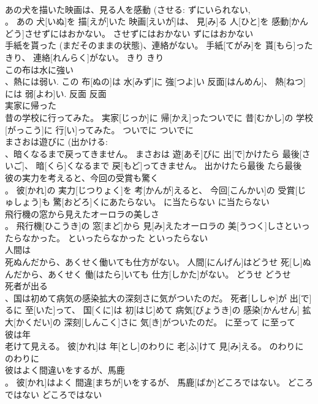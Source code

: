 \documentclass[8pt]{extreport}
\begin{document}
\begin{CJK}{UTF8}{min}
\\	あの犬を描いた映画は、見る人を感動 (させる: ずにいられない, 
\\	。	あの 犬[いぬ]を 描[えが]いた 映画[えいが]は、 見[み]る 人[ひと]を 感動[かんどう]させずにはおかない。	させずにはおかない	ずにはおかない	
\\	手紙を貰った (まだそのままの状態)、連絡がない。	手紙[てがみ]を 貰[もら]ったきり、 連絡[れんらく]がない。	きり	きり	
\\	この布は水に強い 
\\	、熱には弱い.	この 布[ぬの]は 水[みず]に 強[つよ]い 反面[はんめん]、 熱[ねつ]には 弱[よわ]い.	反面	反面	
\\	実家に帰った 
\\	昔の学校に行ってみた。	実家[じっか]に 帰[かえ]ったついでに 昔[むかし]の 学校[がっこう]に 行[い]ってみた。	ついでに	ついでに	
\\	まさおは遊びに (出かける: 
\\	、暗くなるまで戻ってきません。	まさおは 遊[あそ]びに 出[で]かけたら 最後[さいご]、 暗[くら]くなるまで 戻[もど]ってきません。	出かけたら最後	たら最後	
\\	彼の実力を考えると、今回の受賞も驚く 
\\	。	彼[かれ]の 実力[じつりょく]を 考[かんが]えると、 今回[こんかい]の 受賞[じゅしょう]も 驚[おどろ]くにあたらない。	に当たらない	に当たらない	
\\	飛行機の窓から見えたオーロラの美しさ 
\\	。	飛行機[ひこうき]の 窓[まど]から 見[み]えたオーロラの 美[うつく]しさといったらなかった。	といったらなかった	といったらない	
\\	人間は 
\\	死ぬんだから、あくせく働いても仕方がない。	人間[にんげん]はどうせ 死[し]ぬんだから、あくせく 働[はたら]いても 仕方[しかた]がない。	どうせ	どうせ~	
\\	死者が出る 
\\	、国は初めて病気の感染拡大の深刻さに気がついたのだ。	死者[ししゃ]が 出[で]るに 至[いた]って、 国[くに]は 初[はじ]めて 病気[びょうき]の 感染[かんせん] 拡大[かくだい]の 深刻[しんこく]さに 気[き]がついたのだ。	に至って	に至って	
\\	彼は年 
\\	老けて見える。	彼[かれ]は 年[とし]のわりに 老[ふ]けて 見[み]える。	のわりに	のわりに	
\\	彼はよく間違いをするが、馬鹿 
\\	。	彼[かれ]はよく 間違[まちが]いをするが、 馬鹿[ばか]どころではない。	どころではない	どころではない	

\end{CJK}
\end{document}

